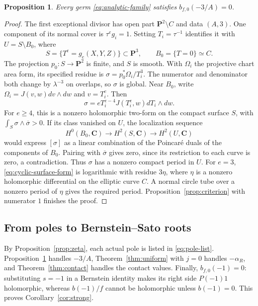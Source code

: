\documentclass[11pt]{article}
\numberwithin{equation}{section}
\newtheorem{proposition}[theorem]{Proposition}
\theoremstyle{definition}
\theoremstyle{remark}
\newcommand{\CC}{\mathbf C}
\newcommand{\PP}{\mathbf P}
\newcommand{\bfzero}{b_{f,0}}
\begin{document}
\begin{proposition}\label{prop:first-root}
Every germ \eqref{eq:analytic-family} satisfies
$\bfzero(-3/A)=0$.
\end{proposition}

\begin{proof}
The first exceptional divisor has open part $\PP^2\setminus C$
and data $(A,3)$. One component of its normal cover is
$\tau^eg_i=1$. Setting $T_i=\tau^{-1}$ identifies it with
$U=S\setminus B_0$, where
\[
 S=\{T^e=g_e(X,Y,Z)\}\subset\PP^3,\qquad B_0=\{T=0\}\simeq C.
\]
The projection $p_0:S\to\PP^2$ is finite, and $S$ is
smooth. With $\Omega_i$ the projective chart area form,
its specified residue is $\sigma=p_0^*\Omega_i/T_i^3$.
The numerator and denominator both change by
$\lambda^{-3}$ on overlaps, so $\sigma$ is global.
Near $B_0$, write
$\Omega_i=J(v,w)dv\wedge dw$ and $v=T_i^e$. Then
\begin{equation}\label{eq:cyclic-surface-form}
 \sigma=eT_i^{e-4}J(T_i^e,w)dT_i\wedge dw.
\end{equation}
For $e\ge4$, this is a nonzero holomorphic two-form on
the compact surface $S$, with
$\int_S\sigma\wedge\overline\sigma>0$. If its class
vanished on $U$, the localization sequence
\[
 H^0(B_0,\CC)\longrightarrow H^2(S,\CC)
                         \longrightarrow H^2(U,\CC)
\]
would express $[\sigma]$ as a linear combination of the
Poincar\'e duals of the components of $B_0$. Pairing with
$\overline\sigma$ gives zero, since its restriction to
each curve is zero, a contradiction. Thus $\sigma$ has a
nonzero compact period in $U$.
For $e=3$, \eqref{eq:cyclic-surface-form} is logarithmic
with residue $3\eta$, where $\eta$ is a nonzero holomorphic
differential on the elliptic curve $C$. A normal circle tube
over a nonzero period of $\eta$ gives the required period.
Proposition~\ref{prop:criterion} with numerator $1$ finishes
the proof.
\end{proof}

\subsection{From poles to Bernstein--Sato roots}

By Proposition~\ref{prop:zeta}, each actual pole is listed
in \eqref{eq:pole-list}. Proposition~\ref{prop:first-root}
handles $-3/A$, Theorem~\ref{thm:uniform} with $j=0$
handles $-\alpha_R$, and Theorem~\ref{thm:contact} handles
the contact values. Finally, $\bfzero(-1)=0$: substituting
$s=-1$ in a Bernstein identity makes its right side
$P(-1)1$ holomorphic, whereas $b(-1)/f$ cannot be
holomorphic unless $b(-1)=0$. This proves
Corollary~\ref{cor:strong}.
\end{document}

